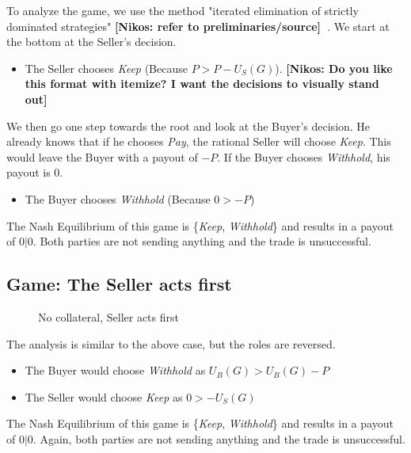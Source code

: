\documentclass{cacthesis}
\newcommand{\authnote}[3]{{ \footnotesize \textbf{#1[#2: #3]~}}}
\newcommand{\niknote}[1]{\authnote{\color{red}}{Nikos}{#1}}
\begin{document}
To analyze the game, we use the method "iterated elimination of strictly dominated strategies"\niknote{refer to preliminaries/source}. We start at the bottom at the Seller's decision.
\begin{itemize}
    \item The Seller chooses \emph{Keep} (Because $P > P - U_S(G)$).\niknote{Do you like this format with itemize? I want the decisions to visually stand out}
\end{itemize}
    We then go one step towards the root and look at the Buyer's decision. He already knows that if he chooses \emph{Pay}, the rational Seller will choose \emph{Keep}. This would leave the Buyer with a payout of $-P$. If the Buyer chooses \emph{Withhold}, his payout is $0$.
\begin{itemize}
    \item The Buyer chooses \emph{Withhold} (Because $0 > -P$)
\end{itemize} 
The Nash Equilibrium of this game is \{\emph{Keep}, \emph{Withhold}\} and results in a payout of $0|0$. Both parties are not sending anything and the trade is unsuccessful.

\subsection{Game: The Seller acts first} 

\begin{figure}[htb!]
\centering
\label{fig:nocol-Seller-first}
\caption{No collateral, Seller acts first}
\end{figure}


The analysis is similar to the above case, but the roles are reversed. 
\begin{itemize}
    \item The Buyer would choose \emph{Withhold} as $U_B(G) > U_B(G)-P$
    \item The Seller would choose \emph{Keep} as $0 > -U_S(G)$
\end{itemize}
The Nash Equilibrium of this game is \{\emph{Keep}, \emph{Withhold}\} and results in a payout of $0|0$. Again, both parties are not sending anything and the trade is unsuccessful.
\end{document}
